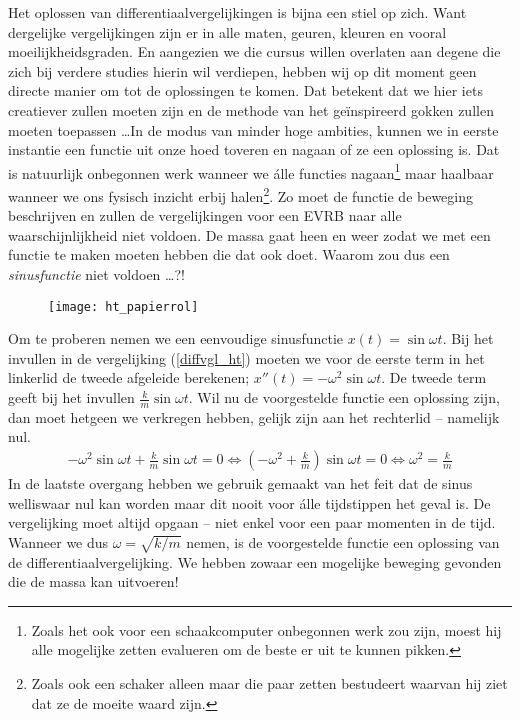 \documentclass{ximera}
\begin{document}
	Het oplossen van differentiaalvergelijkingen is bijna een stiel op zich. Want dergelijke vergelijkingen zijn er in alle maten, geuren, kleuren en vooral moeilijkheidsgraden. En aangezien we die cursus willen overlaten aan degene die zich bij verdere studies hierin wil verdiepen, hebben wij op dit moment geen directe manier om tot de oplossingen te komen. Dat betekent dat we hier iets creatiever zullen moeten zijn en de methode van het ge\"inspireerd gokken zullen moeten toepassen \ldots In de modus van minder hoge ambities, kunnen we in eerste instantie een functie uit onze hoed toveren en nagaan of ze een oplossing is. Dat is natuurlijk onbegonnen werk wanneer we \'alle functies nagaan\footnote{Zoals het ook voor een schaakcomputer onbegonnen werk zou zijn, moest hij alle mogelijke zetten evalueren om de beste er uit te kunnen pikken.} maar haalbaar wanneer we ons fysisch inzicht erbij halen\footnote{Zoals ook een schaker alleen maar die paar zetten bestudeert waarvan hij ziet dat ze de moeite waard zijn.}. Zo moet de functie de beweging beschrijven en zullen de vergelijkingen voor een EVRB naar alle waarschijnlijkheid niet voldoen. De massa gaat heen en weer zodat we met een functie te maken moeten hebben die dat ook doet. Waarom zou dus een \emph{sinusfunctie} niet voldoen \ldots?!
	\begin{figure}[h]
	\centering
	\texttt{[image: ht\_papierrol]}
	\end{figure}
	
	Om te proberen nemen we een eenvoudige sinusfunctie $x(t)=\sin\omega t$. Bij het invullen in de vergelijking (\ref{diffvgl_ht}) moeten we voor de eerste term in het linkerlid de tweede afgeleide berekenen; $x''(t)=-\omega^2\sin\omega t$. De tweede term geeft bij het invullen $\frac{k}{m}\sin\omega t$. Wil nu de voorgestelde functie een oplossing zijn, dan moet hetgeen we verkregen hebben, gelijk zijn aan het rechterlid -- namelijk nul.
	\begin{eqnarray*}
	 -\omega^2\sin\omega t+\frac{k}{m}\sin\omega t=0\Leftrightarrow\left(-\omega^2+\frac{k}{m}\right)\sin\omega t=0\Leftrightarrow\omega^2=\frac{k}{m}
	\end{eqnarray*}
	In de laatste overgang hebben we gebruik gemaakt van het feit dat de sinus welliswaar nul kan worden maar dit nooit voor \'alle tijdstippen het geval is. De vergelijking moet altijd opgaan -- niet enkel voor een paar momenten in de tijd. Wanneer we dus $\omega=\sqrt{k/m}$ nemen, is de voorgestelde functie een oplossing van de differentiaalvergelijking. We hebben zowaar een mogelijke beweging gevonden die de massa kan uitvoeren!
	
\end{document}
